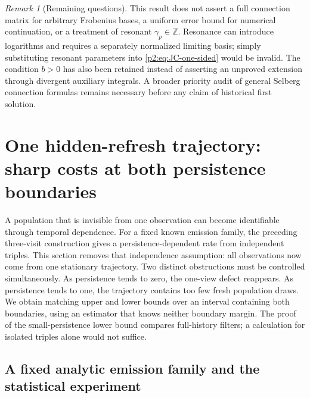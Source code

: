 \documentclass[11pt,a4paper]{article}
\theoremstyle{definition}
\theoremstyle{remark}
\newtheorem{remark}[theorem]{Remark}
\numberwithin{equation}{section}
\begin{document}
\begin{remark}[Remaining questions]
This result does not assert a full connection matrix for arbitrary
Frobenius bases, a uniform error bound for numerical continuation,
or a treatment of resonant $\gamma_p\in\mathbb Z$.  Resonance can
introduce logarithms and requires a separately normalized limiting
basis; simply substituting resonant parameters into
\eqref{p2:eq:JC-one-sided} would be invalid.  The condition $b>0$
has also been retained instead of asserting an unproved extension
through divergent auxiliary integrals.  A broader priority audit
of general Selberg connection formulas remains necessary before
any claim of historical first solution.
\end{remark}



\section{One hidden-refresh trajectory: sharp costs at both persistence boundaries}
\label{p2:sec:long-chain}

A population that is invisible from one observation can become identifiable
through temporal dependence.  For a fixed known emission family, the preceding
three-visit construction gives a persistence-dependent rate from independent
triples.  This section removes that independence assumption: all observations
now come from one stationary trajectory.  Two distinct obstructions must be
controlled simultaneously.  As persistence tends to zero, the one-view defect
reappears.  As persistence tends to one, the trajectory contains too few fresh
population draws.  We obtain matching upper and lower bounds over an interval
containing both boundaries, using an estimator that knows neither boundary
margin.  The proof of the small-persistence lower bound compares full-history
filters; a calculation for isolated triples alone would not suffice.

\subsection{A fixed analytic emission family and the statistical experiment}
\end{document}
